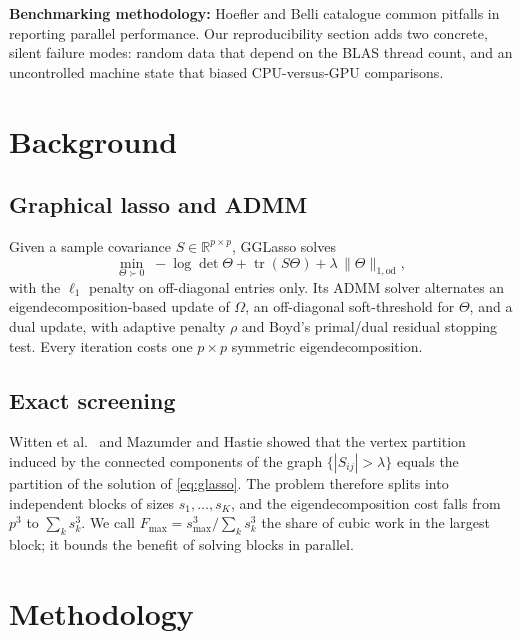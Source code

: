 \documentclass[conference]{IEEEtran}
\begin{document}
\textbf{Benchmarking methodology:} Hoefler and Belli \cite{hoefler2015}
catalogue common pitfalls in reporting parallel performance. Our
reproducibility section adds two concrete, silent failure modes: random data
that depend on the BLAS thread count, and an uncontrolled machine state that
biased CPU-versus-GPU comparisons.

\section{Background}

\subsection{Graphical lasso and ADMM}
Given a sample covariance $S\in\mathbb{R}^{p\times p}$, GGLasso solves
\begin{equation}
\min_{\Theta\succ 0}\; -\log\det\Theta + \operatorname{tr}(S\Theta)
 + \lambda\,\lVert\Theta\rVert_{1,\mathrm{od}},
\label{eq:glasso}
\end{equation}
with the $\ell_1$ penalty on off-diagonal entries only. Its ADMM solver
\cite{boyd2011} alternates an eigendecomposition-based update of $\Omega$,
an off-diagonal soft-threshold for $\Theta$, and a dual update, with
adaptive penalty $\rho$ and Boyd's primal/dual residual stopping test.
Every iteration costs one $p\times p$ symmetric eigendecomposition.

\subsection{Exact screening}
Witten et al.\ \cite{witten2011} and Mazumder and Hastie \cite{mazumder2012}
showed that the vertex partition induced by the connected components of the
graph $\{|S_{ij}|>\lambda\}$ equals the partition of the solution of
\eqref{eq:glasso}. The problem therefore splits into independent blocks of
sizes $s_1,\dots,s_K$, and the eigendecomposition cost falls from $p^3$ to
$\sum_k s_k^3$. We call $F_{\max}=s_{\max}^3/\sum_k s_k^3$ the share of cubic
work in the largest block; it bounds the benefit of solving blocks in
parallel.

\section{Methodology}
\end{document}
